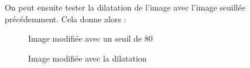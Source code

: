 \documentclass[french,a4paper,10pt]{article}
\begin{document}
	On peut ensuite tester la dilatation de l'image avec l'image seuillée précédemment.
	Cela donne alors :
	\begin{figure}[!htb]
		\begin{minipage}{0.48\textwidth}
			\centering
			\caption{Image modifiée avec un seuil de 80}\label{Fig:test-grey-08-3}
		\end{minipage}\hfill
		\begin{minipage}{0.48\textwidth}
			\centering
			\caption{Image modifiée avec la dilatation}\label{Fig:dilatation-test-grey-08}
		\end{minipage}
	\end{figure}
\end{document}
